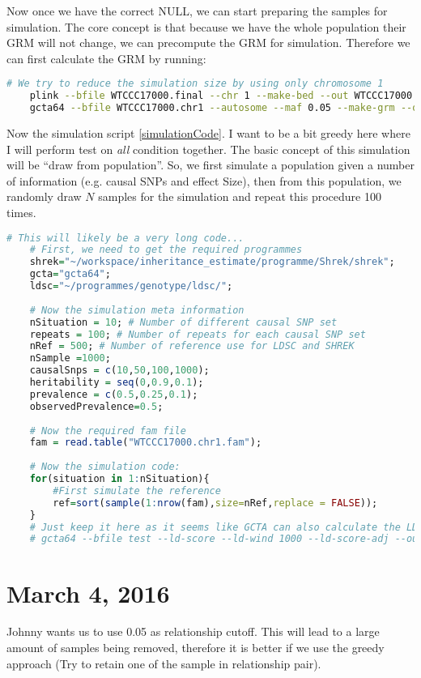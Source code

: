 \documentclass[12pt]{article}
\begin{document}
	Now once we have the correct NULL, we can start preparing the samples for simulation. 
	The core concept is that because we have the whole population their GRM will not change, we can precompute the GRM for simulation.
	Therefore we can first calculate the GRM by running:
	\begin{lstlisting}[language=bash]
	# We try to reduce the simulation size by using only chromosome 1
	plink --bfile WTCCC17000.final --chr 1 --make-bed --out WTCCC17000.chr1
	gcta64 --bfile WTCCC17000.chr1 --autosome --maf 0.05 --make-grm --out WTCCC17000.chr1.gcta --make-grm-gz --thread-num 10
	\end{lstlisting}
	
	Now the simulation script \cref{simulationCode}. 
	I want to be a bit greedy here where I will perform test on \emph{all} condition together.
	The basic concept of this simulation will be ``draw from population''. 
	So, we first simulate a population given a number of information (e.g. causal SNPs and effect Size), then from this population, we randomly draw $N$ samples for the simulation and repeat this procedure 100 times.
	\newpage
	\begin{lstlisting}[label=simulationCode,language=R]
	# This will likely be a very long code...
	# First, we need to get the required programmes
	shrek="~/workspace/inheritance_estimate/programme/Shrek/shrek";
	gcta="gcta64";
	ldsc="~/programmes/genotype/ldsc/";
	
	# Now the simulation meta information
	nSituation = 10; # Number of different causal SNP set
	repeats = 100; # Number of repeats for each causal SNP set
	nRef = 500; # Number of reference use for LDSC and SHREK
	nSample =1000;
	causalSnps = c(10,50,100,1000);
	heritability = seq(0,0.9,0.1);
	prevalence = c(0.5,0.25,0.1);
	observedPrevalence=0.5;
	
	# Now the required fam file
	fam = read.table("WTCCC17000.chr1.fam");
	
	# Now the simulation code:
	for(situation in 1:nSituation){
		#First simulate the reference
		ref=sort(sample(1:nrow(fam),size=nRef,replace = FALSE));
	}
	# Just keep it here as it seems like GCTA can also calculate the LDSC
	# gcta64 --bfile test --ld-score --ld-wind 1000 --ld-score-adj --out test
	\end{lstlisting}
	
	\section{March 4, 2016}
		Johnny wants us to use 0.05 as relationship cutoff. 
		This will lead to a large amount of samples being removed, therefore it is better if we use the greedy approach (Try to retain one of the sample in relationship pair).
		
\end{document}
